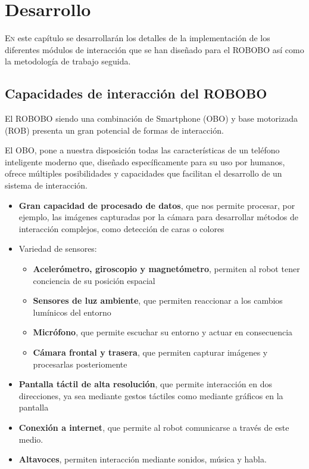 
\chapter{Desarrollo}
\label{chap:desarrollo}
\vspace{0.5cm}

\lettrine{E}{n} este capítulo se desarrollarán los detalles de la implementación de los diferentes módulos de interacción que se han diseñado para el ROBOBO así como la metodología de trabajo seguida.
\section{Capacidades de interacción del ROBOBO}
\label{sec:capacidades-interactivas}

El ROBOBO siendo una combinación de Smartphone (OBO) y base motorizada (ROB) presenta un gran potencial de formas de interacción.

El OBO, pone a nuestra disposición todas las características de un teléfono inteligente moderno que, diseñado específicamente para su uso por humanos, ofrece múltiples posibilidades y capacidades que facilitan el desarrollo de un sistema de interacción.
\begin{itemize}
	\item \textbf{Gran capacidad de procesado de datos}, que nos permite procesar, por ejemplo, las imágenes capturadas por la cámara para desarrollar métodos de interacción complejos, como detección de caras o colores
	\item Variedad de sensores:
	\begin{itemize}
		\item \textbf{Acelerómetro, giroscopio y magnetómetro}, permiten al robot tener conciencia de su posición espacial
		\item \textbf{Sensores de luz ambiente}, que permiten reaccionar a los cambios lumínicos del entorno
		\item \textbf{Micrófono}, que permite escuchar su entorno y actuar en consecuencia
		\item \textbf{Cámara frontal y trasera}, que permiten capturar imágenes y procesarlas posteriomente
	\end{itemize}
	\item \textbf{Pantalla táctil de alta resolución}, que permite interacción en dos direcciones, ya sea mediante gestos táctiles como mediante gráficos en la pantalla
	\item \textbf{Conexión a internet}, que permite al robot comunicarse a través de este medio.
	\item \textbf{Altavoces}, permiten interacción mediante sonidos, música y habla.
\end{itemize}


